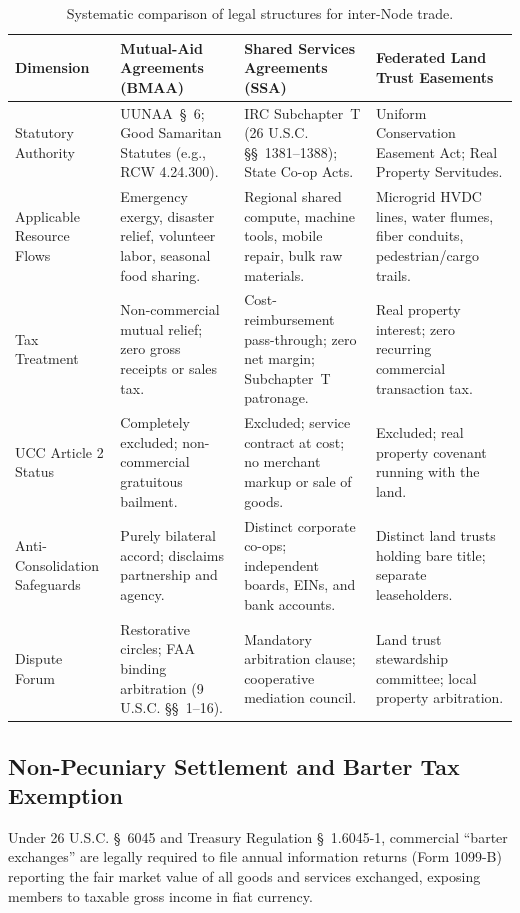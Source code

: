 \begin{table}[htbp]
\centering
\small
\begin{tabular}{|p{}|p{}|p{}|p{}|}
\hline
\textbf{Dimension} & \textbf{Mutual-Aid Agreements (BMAA)} & \textbf{Shared Services Agreements (SSA)} & \textbf{Federated Land Trust Easements} \\
\hline
Statutory Authority & UUNAA~\S~6; Good Samaritan Statutes (e.g., RCW 4.24.300). & IRC Subchapter~T (26 U.S.C. \S\S~1381--1388); State Co-op Acts. & Uniform Conservation Easement Act; Real Property Servitudes. \\
\hline
Applicable Resource Flows & Emergency exergy, disaster relief, volunteer labor, seasonal food sharing. & Regional shared compute, machine tools, mobile repair, bulk raw materials. & Microgrid HVDC lines, water flumes, fiber conduits, pedestrian/cargo trails. \\
\hline
Tax Treatment & Non-commercial mutual relief; zero gross receipts or sales tax. & Cost-reimbursement pass-through; zero net margin; Subchapter~T patronage. & Real property interest; zero recurring commercial transaction tax. \\
\hline
UCC Article 2 Status & Completely excluded; non-commercial gratuitous bailment. & Excluded; service contract at cost; no merchant markup or sale of goods. & Excluded; real property covenant running with the land. \\
\hline
Anti-Consolidation Safeguards & Purely bilateral accord; disclaims partnership and agency. & Distinct corporate co-ops; independent boards, EINs, and bank accounts. & Distinct land trusts holding bare title; separate leaseholders. \\
\hline
Dispute Forum & Restorative circles; FAA binding arbitration (9 U.S.C. \S\S~1--16). & Mandatory arbitration clause; cooperative mediation council. & Land trust stewardship committee; local property arbitration. \\
\hline
\end{tabular}
\caption{Systematic comparison of legal structures for inter-Node trade.}
\label{tab:l7-trade-structures}
\end{table}

\subsection{Non-Pecuniary Settlement and Barter Tax Exemption}

Under 26 U.S.C. \S~6045 and Treasury Regulation \S~1.6045-1, commercial ``barter exchanges'' are legally required to file annual information returns (Form 1099-B) reporting the fair market value of all goods and services exchanged, exposing members to taxable gross income in fiat currency.

